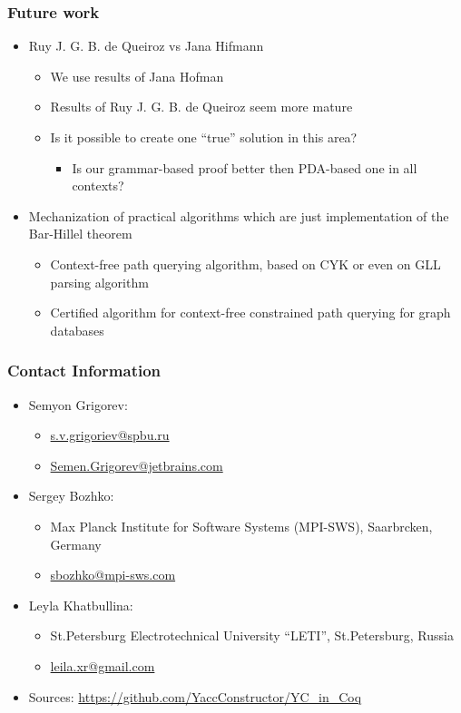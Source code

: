 \documentclass[xcolor=table]{beamer}
\begin{document}
\begin{frame} \frametitle{Future work}

\begin{itemize}
 \item Ruy J. G. B. de Queiroz vs Jana Hifmann
 \begin{itemize}
   \item We use results of Jana Hofman
   \item Results of Ruy J. G. B. de Queiroz seem more mature
   \item Is it possible to create one ``true'' solution in this area?
   \begin{itemize}
     \item Is our grammar-based proof better then PDA-based one in all contexts?
   \end{itemize}
 \end{itemize}
 \pause
 \item Mechanization of practical algorithms which are just implementation of the Bar-Hillel theorem
 \begin{itemize}
   \item Context-free path querying algorithm, based on CYK or even on GLL parsing algorithm
   \item Certified algorithm for context-free constrained path querying for graph databases
 \end{itemize}
\end{itemize}

\end{frame}



\begin{frame}
\frametitle{Contact Information}
\begin{itemize}
  \item Semyon Grigorev:
    \begin{itemize}
      \item \href{mailto:s.v.grigoriev@spbu.ru}{s.v.grigoriev@spbu.ru}
      \item \href{mailto:Semen.Grigorev@jetbrains.com}{Semen.Grigorev@jetbrains.com}
    \end{itemize}
  \item Sergey Bozhko:
  \begin{itemize}
    \item  Max Planck Institute for Software Systems (MPI-SWS), Saarbrcken, Germany
    \item  \href{mailto:sbozhko@mpi-sws.com}{sbozhko@mpi-sws.com}
  \end{itemize}
    \item Leyla Khatbullina:
  \begin{itemize}
    \item St.Petersburg Electrotechnical University ``LETI'', St.Petersburg, Russia
    \item  \href{mailto:leila.xr@gmail.com}{leila.xr@gmail.com}
  \end{itemize}
  \item Sources: \href{https://github.com/YaccConstructor/YC_in_Coq}{https://github.com/YaccConstructor/YC\_in\_Coq}
\end{itemize}
\vspace{0.5cm}
\end{frame}
\end{document}
